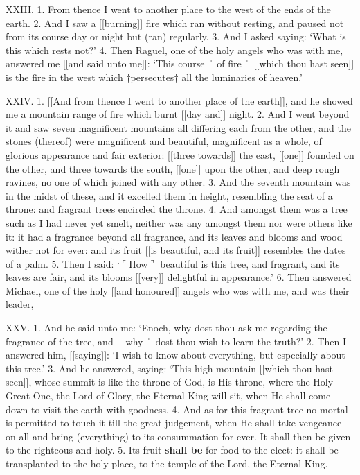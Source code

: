 XXIII. 1. From thence I went to another place
to the west of the ends of the earth. 2. And I saw
a [[burning]] fire which ran without resting, and paused
not from its course day or night but (ran) regularly.
3. And I asked saying: ‘What is this which rests
not?’ 4. Then Raguel, one of the holy angels who
was with me, answered me [[and said unto me]]:
‘This course $\ulcorner$of fire$\urcorner$ [[which thou hast seen]] is the
fire in the west which †persecutes† all the luminaries
of heaven.’


XXIV. 1. [[And from thence I went to another
place of the earth]], and he showed me a mountain
range of fire which burnt [[day and]] night. 2. And
I went beyond it and saw seven magnificent mountains
all differing each from the other, and the stones
(thereof) were magnificent and beautiful, magnificent
as a whole, of glorious appearance and fair exterior:
[[three towards]] the east, [[one]] founded on the other,
and three towards the south, [[one]] upon the other,
and deep rough ravines, no one of which joined with
any other. 3. And the seventh mountain was in the
midst of these, and it excelled them in height, resembling
the seat of a throne: and fragrant trees encircled
the throne. 4. And amongst them was a tree such
as I had never yet smelt, neither was any amongst
them nor were others like it: it had a fragrance beyond
all fragrance, and its leaves and blooms and wood
wither not for ever: and its fruit [[is beautiful, and
its fruit]] resembles the dates of a palm. 5. Then I
said: ‘$\ulcorner$How$\urcorner$ beautiful is this tree, and fragrant,
and its leaves are fair, and its blooms [[very]] delightful
in appearance.’ 6. Then answered Michael, one
of the holy [[and honoured]] angels who was with me,
and was their leader,

XXV. 1. And he said unto me: ‘Enoch, why dost
thou ask me regarding the fragrance of the tree, and
$\ulcorner$why$\urcorner$ dost thou wish to learn the truth?’ 2. Then
I answered him, [[saying]]: ‘I wish to know about
everything, but especially about this tree.’ 3. And
he answered, saying: ‘This high mountain [[which
thou hast seen]], whose summit is like the throne of
God, is His throne, where the Holy Great One, the
Lord of Glory, the Eternal King will sit, when He
shall come down to visit the earth with goodness.
4. And as for this fragrant tree no mortal is permitted
to touch it till the great judgement, when He
shall take vengeance on all and bring (everything)
to its consummation for ever. It shall then be given
to the righteous and holy. 5. Its fruit \textbf{shall be} for
food to the elect: it shall be transplanted to the holy
place, to the temple of the Lord, the Eternal King.


